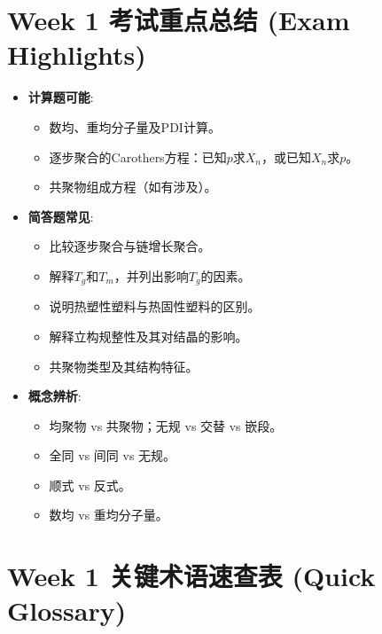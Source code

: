 \documentclass[12pt,a4paper]{ctexart}
\begin{document}
\section{Week 1 考试重点总结 (Exam Highlights)}
\begin{itemize}
    \item \textbf{计算题可能}: 
    \begin{itemize}
        \item 数均、重均分子量及PDI计算。
        \item 逐步聚合的Carothers方程：已知$p$求$X_n$，或已知$X_n$求$p$。
        \item 共聚物组成方程（如有涉及）。
    \end{itemize}
    \item \textbf{简答题常见}:
    \begin{itemize}
        \item 比较逐步聚合与链增长聚合。
        \item 解释$T_g$和$T_m$，并列出影响$T_g$的因素。
        \item 说明热塑性塑料与热固性塑料的区别。
        \item 解释立构规整性及其对结晶的影响。
        \item 共聚物类型及其结构特征。
    \end{itemize}
    \item \textbf{概念辨析}:
    \begin{itemize}
        \item 均聚物 vs 共聚物；无规 vs 交替 vs 嵌段。
        \item 全同 vs 间同 vs 无规。
        \item 顺式 vs 反式。
        \item 数均 vs 重均分子量。
    \end{itemize}
\end{itemize}

\newpage
\section{Week 1 关键术语速查表 (Quick Glossary)}
\end{document}

